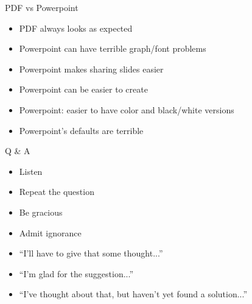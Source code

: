\documentclass[12pt]{article}
\newcommand{\headsize}{\fontsize{35}{35} \selectfont}
\newcommand{\smallsize}{\fontsize{25}{30} \selectfont}
\begin{document}
\newpage

\headsize \color{myyellow}
\hfill \begin{minipage}{5.75in}
\centering
PDF vs Powerpoint
\end{minipage}

\vspace{3cm} \color{mywhite} \smallsize

\hfill \begin{minipage}{9.5in}

\begin{itemize}
\itemsep18pt
\item PDF always looks as expected

\item Powerpoint can have terrible graph/font problems

\item Powerpoint makes sharing slides easier

\item Powerpoint can be easier to create

\item Powerpoint: easier to have color and black/white versions

\item Powerpoint's defaults are terrible

\end{itemize}

\end{minipage}




\newpage

\headsize \color{myyellow}
\hfill \begin{minipage}{5.75in}
\centering
Q \& A
\end{minipage}

\vspace{3cm} \color{mywhite} \smallsize

\hfill \begin{minipage}{9.5in}

\begin{itemize}
\itemsep18pt
\item Listen

\item Repeat the question 

\item Be gracious

\item Admit ignorance

\item ``I'll have to give that some thought...''

\item ``I'm glad for the suggestion...''

\item ``I've thought about that, but haven't yet found a solution...''
\end{itemize}

\end{minipage}
\end{document}
